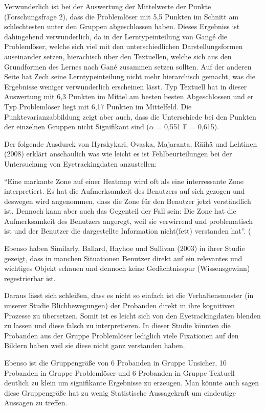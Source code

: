 Verwunderlich ist bei der Auswertung der Mittelwerte der Punkte (Forschungsfrage 2), dass die Problemlöser mit 5,5 Punkten im Schnitt am schlechtesten unter den Gruppen abgeschlossen haben. Dieses Ergebniss ist dahingehend verwunderlich, da in der Lerntypeinteilung von Gangé die Problemlöser, welche sich viel mit den unterschiedlichen Darstellungsformen auseinander setzen, hierachisch über den Textuellen, welche sich aus den Grundformen des Lernes nach Gané zusammen setzen sollten. Auf der anderen Seite hat Zech seine Lerntypeinteilung nicht mehr hierarchisch gemacht, was die Ergebnisse weniger verwunderlich erscheinen lässt. Typ Textuell hat in dieser Auswertung mit 6,3 Punkten im Mittel am besten besten Abgeschlossen und er Typ Problemlöser liegt mit 6,17 Punkten im Mittelfeld. Die Punktevarianzabbildung zeigt aber auch, dass die Unterschiede bei den Punkten der einzelnen Gruppen nicht Signifikant sind ($\alpha$ = 0,551 F = 0,615). 

Der folgende Ausdurck von Hyrskykari, Ovaska, Majaranta, Räihä und Lehtinen (2008) erklärt anschaulich was wie leicht es ist Fehlbeurteilungen bei der Untersuchung von Eyetrackingdaten anzustellen:

``Eine markante Zone auf einer Heatmap wird oft als eine interressante Zone interpretiert. Es hat die Aufmerksamkeit des Benutzers auf sich gezogen und deswegen wird angenommen, dass die Zone für den Benutzer jetzt verständlich ist. Dennoch kann aber auch das Gegenteil der Fall sein: Die Zone hat die Aufmerksamkeit des Benutzers angeregt, weil sie verwirrend und problematisch ist und der Benutzer die dargestellte Information nicht(fett) verstanden hat''. (%

Ebenso haben Similarly, Ballard, Hayhoe und Sullivan (2003) in ihrer Studie gezeigt, dass in manchen Situationen Benutzer direkt auf ein relevantes und wichtiges Objekt schauen und dennoch keine Gedächtnisspur (Wissensgewinn) regestrierbar ist. 

Daraus lässt sich schleißen, dass es nicht so einfach ist die Verhaltensmuster (in unserer Studie Blichbewegungen) der Probanden direkt in ihre kognitiven Prozesse zu übersetzen. Somit ist es leicht sich von den Eyetrackingdaten blenden zu lassen und diese falsch zu interpretieren. In dieser Studie könnten die Probanden aus der Gruppe Problemlöser lediglich viele Fixationen auf den Bildern haben weil sie diese nicht ganz verstanden haben. 

Ebenso ist die Gruppengröße von 6 Probanden in Gruppe Unsicher, 10 Probanden in Gruppe Problemlöser und 6 Probanden in Gruppe Textuell deutlich zu klein um signifikante Ergebnisse zu erzeugen. Man könnte auch sagen diese Gruppengröße hat zu wenig Statistische Aussagekraft um eindeutige Aussagen zu treffen. 

